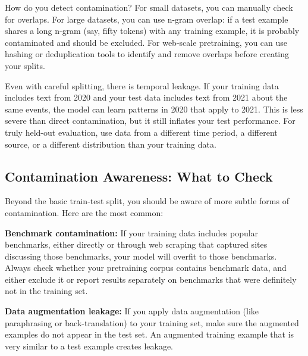 \vspace{0.3cm}

How do you detect contamination? For small datasets, you can manually check for overlaps. For large datasets, you can use n-gram overlap: if a test example shares a long n-gram (say, fifty tokens) with any training example, it is probably contaminated and should be excluded. For web-scale pretraining, you can use hashing or deduplication tools to identify and remove overlaps before creating your splits.

\vspace{0.3cm}

Even with careful splitting, there is temporal leakage. If your training data includes text from 2020 and your test data includes text from 2021 about the same events, the model can learn patterns in 2020 that apply to 2021. This is less severe than direct contamination, but it still inflates your test performance. For truly held-out evaluation, use data from a different time period, a different source, or a different distribution than your training data.

\vspace{1em}

\subsection{Contamination Awareness: What to Check}

Beyond the basic train-test split, you should be aware of more subtle forms of contamination. Here are the most common:

\vspace{0.3cm}

\textbf{Benchmark contamination:} If your training data includes popular benchmarks, either directly or through web scraping that captured sites discussing those benchmarks, your model will overfit to those benchmarks. Always check whether your pretraining corpus contains benchmark data, and either exclude it or report results separately on benchmarks that were definitely not in the training set.

\vspace{0.3cm}

\textbf{Data augmentation leakage:} If you apply data augmentation (like paraphrasing or back-translation) to your training set, make sure the augmented examples do not appear in the test set. An augmented training example that is very similar to a test example creates leakage.

